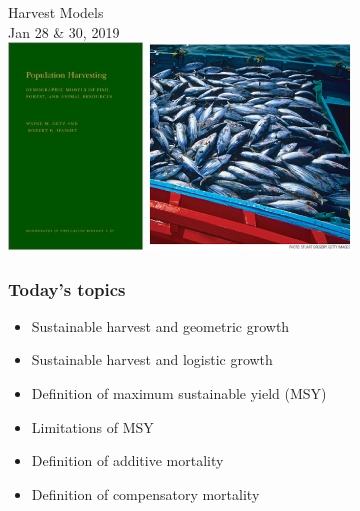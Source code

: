 \documentclass[color=usenames,dvipsnames]{beamer}\usepackage[]{graphicx}\usepackage[]{color}
\begin{document}
\begin{frame}[plain]
  \begin{center}
    {\huge Harvest Models} \\
    {\large Jan 28 \& 30, 2019} \\
    \vfill
    \includegraphics[height=5.5cm,keepaspectratio]{figs/book} \hspace{0.3cm}
    \includegraphics[height=5.5cm,keepaspectratio]{figs/tuna}
  \end{center}
\end{frame}



\begin{frame}
  \frametitle{Today's topics}
  \Large
  \begin{itemize}
    \item Sustainable harvest and geometric growth
    \item Sustainable harvest and logistic growth
    \item Definition of maximum sustainable yield (MSY)
    \item Limitations of MSY
    \item Definition of additive mortality
    \item Definition of compensatory mortality
  \end{itemize}
\end{frame}
\end{document}
